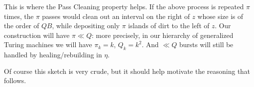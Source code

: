 \documentclass[12pt]{memoir}
\def\B{B}
\newcommand{\Q}{Q}
\begin{document}
This is where the Pass Cleaning property helps.
If the above process is repeated \( \pi \) times, the \( \pi \) passes
would clean out an interval on the
right of \( z \) whose size is of the order of \( \Q\B \),
while depositing only \( \pi \) islands of dirt to the left of \( z \).
Our construction will have \( \pi\ll \Q \): more precisely, in our hierarchy
of generalized Turing machines we will have \( \pi_{k}=k \), \( \Q_{k}=k^{2} \). %
And \( \ll \Q \) bursts will still be handled by healing/rebuilding in \( \eta \).

Of course this sketch is very crude, but it should help motivate the reasoning that
follows.





\end{document}
